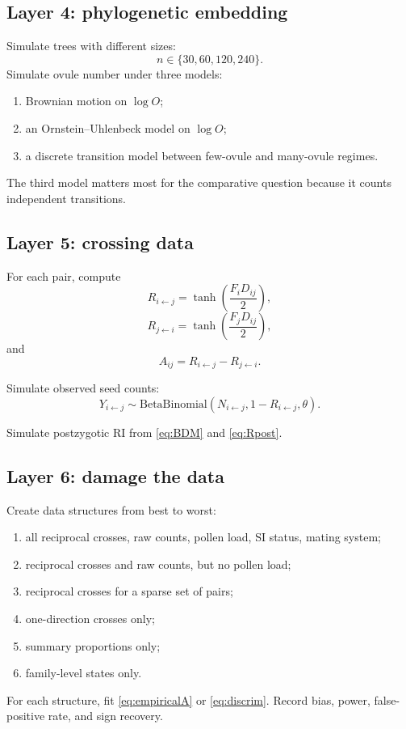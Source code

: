 \documentclass[12pt]{article}
\begin{document}
\subsection{Layer 4: phylogenetic embedding}

Simulate trees with different sizes:
\begin{equation}
n\in\{30,60,120,240\}.
\end{equation}
Simulate ovule number under three models:
\begin{enumerate}
\item Brownian motion on $\log O$;
\item an Ornstein--Uhlenbeck model on $\log O$;
\item a discrete transition model between few-ovule and many-ovule regimes.
\end{enumerate}

The third model matters most for the comparative question because it counts independent transitions.

\subsection{Layer 5: crossing data}

For each pair, compute
\begin{equation}
R_{i\leftarrow j}=\tanh\left(\frac{F_iD_{ij}}{2}\right),
\end{equation}
\begin{equation}
R_{j\leftarrow i}=\tanh\left(\frac{F_jD_{ij}}{2}\right),
\end{equation}
and
\begin{equation}
A_{ij}=R_{i\leftarrow j}-R_{j\leftarrow i}.
\end{equation}

Simulate observed seed counts:
\begin{equation}
Y_{i\leftarrow j}\sim \mathrm{BetaBinomial}(N_{i\leftarrow j},1-R_{i\leftarrow j},\theta).
\end{equation}

Simulate postzygotic RI from \eqref{eq:BDM} and \eqref{eq:Rpost}.

\subsection{Layer 6: damage the data}

Create data structures from best to worst:
\begin{enumerate}
\item all reciprocal crosses, raw counts, pollen load, SI status, mating system;
\item reciprocal crosses and raw counts, but no pollen load;
\item reciprocal crosses for a sparse set of pairs;
\item one-direction crosses only;
\item summary proportions only;
\item family-level states only.
\end{enumerate}
For each structure, fit \eqref{eq:empiricalA} or \eqref{eq:discrim}. Record bias, power, false-positive rate, and sign recovery.
\end{document}
